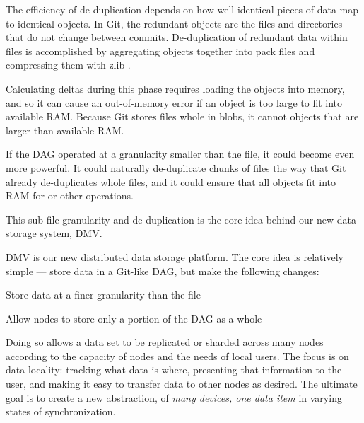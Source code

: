 The efficiency of de-duplication depends on how well identical pieces of data map to identical objects.
In Git, the redundant objects are the files and directories that do not change between commits.
De-duplication of redundant data within files is accomplished by aggregating objects together into pack files and compressing them with zlib \cite[Section 10.4]{git_book}.

Calculating deltas during this  phase requires loading the objects into memory, and so it can cause an out-of-memory error if an object is too large to fit into available RAM.
Because Git stores files whole in \glspl{blob}, it cannot  objects that are larger than available RAM.

If the \gls{DAG} operated at a granularity smaller than the file, it could become even more powerful.
It could naturally de-duplicate chunks of files the way that Git already de-duplicates whole files, and it could ensure that all objects fit into RAM for  or other operations.

This sub-file granularity and de-duplication is the core idea behind our new data storage system, \acrlong{DMV}.

%


\gls{DMV} is our new distributed data storage platform.
The core idea is relatively simple --- store data in a Git-like \gls{DAG}, but make the following changes:

\begin{tight_enumerate}

    \item{Store data at a finer granularity than the file}

    \item{Allow nodes to store only a portion of the \gls{DAG} as a whole}

\end{tight_enumerate}

Doing so allows a data set to be replicated or sharded across many nodes according to the capacity of nodes and the needs of local users.
The focus is on data locality: tracking what data is where, presenting that information to the user, and making it easy to transfer data to other nodes as desired.
The ultimate goal is to create a new abstraction, of \emph{many devices, one data item} in varying states of synchronization.

%

